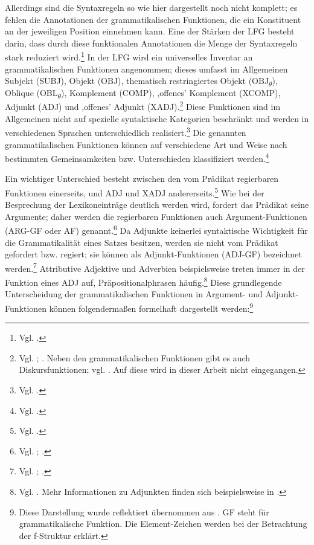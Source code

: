 \documentclass[12pt,a4paper]{article}
\begin{document}
Allerdings sind die Syntaxregeln so wie hier dargestellt noch nicht komplett; es fehlen die Annotationen der grammatikalischen Funktionen, die ein Konstituent an der jeweiligen Position einnehmen kann. Eine der Stärken der LFG besteht darin, dass durch diese funktionalen Annotationen die Menge der Syntaxregeln stark reduziert wird.\footnote{Vgl. \cite[45]{Dal}.} In der LFG wird ein universelles Inventar an grammatikalischen Funktionen angenommen; dieses umfasst im Allgemeinen Subjekt (SUBJ), Objekt (OBJ), thematisch restringiertes Objekt (OBJ\textsubscript{$\theta$}), Oblique (OBL\textsubscript{$\theta$}), Komplement (COMP), ,offenes' Komplement (XCOMP), Adjunkt (ADJ) und ,offenes' Adjunkt (XADJ).\footnote{Vgl. \cite[9]{Dal}; \cite[58]{Falk}. Neben den grammatikalischen Funktionen gibt es auch Diskursfunktionen; vgl. \cite[28; 76-84; 94-101]{Skript}. Auf diese wird in dieser Arbeit nicht eingegangen.} Diese Funktionen sind im Allgemeinen nicht auf spezielle syntaktische Kategorien beschränkt und werden in verschiedenen Sprachen unterschiedlich realisiert.\footnote{Vgl. \cite[9-10]{Bresnan}.} Die genannten grammatikalischen Funktionen können auf verschiedene Art und Weise nach bestimmten Gemeinsamkeiten bzw. Unterschieden klassifiziert werden.\footnote{Vgl. \cite[56-8]{Falk}.} 

Ein wichtiger Unterschied besteht zwischen den vom Prädikat regierbaren Funktionen einerseits, und ADJ und XADJ andererseits.\footnote{Vgl. \cite[56]{Falk}.} Wie bei der Besprechung der Lexikoneinträge deutlich werden wird, fordert das Prädikat seine Argumente; daher werden die regierbaren Funktionen auch Argument-Funktionen (ARG-GF oder AF) genannt.\footnote{Vgl. \cite[28]{Skript}; \cite[58]{Falk}.} Da Adjunkte keinerlei syntaktische Wichtigkeit für die Grammatikalität eines Satzes besitzen, werden sie nicht vom Prädikat gefordert bzw. regiert; sie können als Adjunkt-Funktionen (ADJ-GF) bezeichnet werden.\footnote{Vgl. \cite[10-1]{Dal}; \cite[38]{Skript}.} Attributive Adjektive und Adverbien beispielsweise treten immer in der Funktion eines ADJ auf, Präpositionalphrasen häufig.\footnote{Vgl. \cite[38]{Skript}. Mehr Informationen zu Adjunkten finden sich beispielsweise in \cite[61-2]{Falk}.} Diese grundlegende Unterscheidung der grammatikalischen Funktionen in Argument- und Adjunkt-Funktionen können folgendermaßen formelhaft dargestellt werden:\footnote{Diese Darstellung wurde reflektiert übernommen aus \cite{Snijders}. GF steht für grammatikalische Funktion. Die Element-Zeichen werden bei der Betrachtung der f-Struktur erklärt.}
\end{document}

